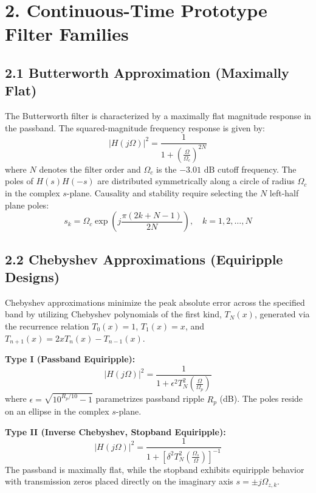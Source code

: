 \documentclass[11pt,a4paper]{article}
\begin{document}
\vspace{10pt}
\section*{2. Continuous-Time Prototype Filter Families}

\subsection*{2.1 Butterworth Approximation (Maximally Flat)}
The Butterworth filter is characterized by a maximally flat magnitude response in the passband. The squared-magnitude frequency response is given by:
\begin{equation}
|H(j\Omega)|^2 = \frac{1}{1 + \left(\frac{\Omega}{\Omega_c}\right)^{2N}}
\end{equation}
where $N$ denotes the filter order and $\Omega_c$ is the $-3.01\text{ dB}$ cutoff frequency. The poles of $H(s)H(-s)$ are distributed symmetrically along a circle of radius $\Omega_c$ in the complex $s$-plane. Causality and stability require selecting the $N$ left-half plane poles:
\begin{equation}
s_k = \Omega_c \exp\left(j \frac{\pi (2k + N - 1)}{2N}\right), \quad k = 1, 2, \dots, N
\end{equation}

\subsection*{2.2 Chebyshev Approximations (Equiripple Designs)}
Chebyshev approximations minimize the peak absolute error across the specified band by utilizing Chebyshev polynomials of the first kind, $T_N(x)$, generated via the recurrence relation $T_0(x) = 1$, $T_1(x) = x$, and $T_{n+1}(x) = 2x T_n(x) - T_{n-1}(x)$.

\textbf{Type I (Passband Equiripple):}
\begin{equation}
|H(j\Omega)|^2 = \frac{1}{1 + \epsilon^2 T_N^2\left(\frac{\Omega}{\Omega_p}\right)}
\end{equation}
where $\epsilon = \sqrt{10^{R_p/10} - 1}$ parametrizes passband ripple $R_p$ (dB). The poles reside on an ellipse in the complex $s$-plane.

\textbf{Type II (Inverse Chebyshev, Stopband Equiripple):}
\begin{equation}
|H(j\Omega)|^2 = \frac{1}{1 + \left[\delta^2 T_N^2\left(\frac{\Omega_s}{\Omega}\right)\right]^{-1}}
\end{equation}
The passband is maximally flat, while the stopband exhibits equiripple behavior with transmission zeros placed directly on the imaginary axis $s = \pm j \Omega_{z,k}$.
\end{document}
